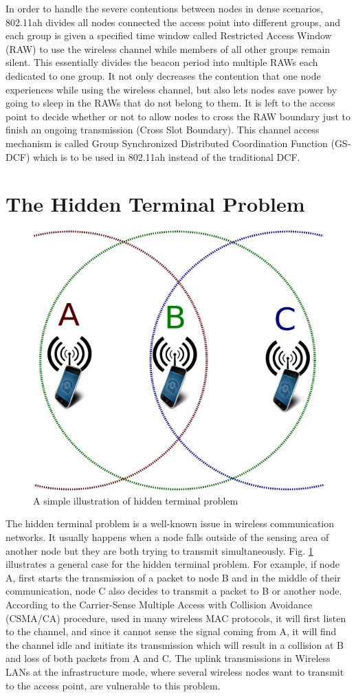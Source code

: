  In order to handle the severe contentions between nodes in dense scenarios, 802.11ah divides all nodes connected the access point into different groups, and each group is given a specified time window called Restricted Access Window (RAW) to use the wireless channel while members of all other groups remain silent. This essentially divides the beacon period into multiple RAWs each dedicated to one group. It not only decreases the contention that one node experiences while using the wireless channel, but also lets nodes save power by going to sleep in the RAWs that do not belong to them. It is left to the access point to decide whether or not to allow nodes to cross the RAW boundary just to finish an ongoing transmission (Cross Slot Boundary). This channel access mechanism is called Group Synchronized Distributed Coordination Function (GS-DCF) which is to be used in 802.11ah instead of the traditional DCF.   

\section{The Hidden Terminal Problem}
\begin{figure} [th]
  \centering
  \includegraphics[width=.65\textwidth]{figures/hidden}
  \caption{A simple illustration of hidden terminal problem}
  \label{fig:hidden}
\end{figure}

The hidden terminal problem is a well-known issue in wireless communication networks. It usually happens when a node falls outside of the sensing area of another node but they are both trying to transmit simultaneously. Fig. \ref{fig:hidden} illustrates a general case for the hidden terminal problem. For example, if node A, first starts the transmission of a packet to node B and in the middle of their communication, node C also decides to transmit a packet to B or another node. According to the Carrier-Sense Multiple Access with Collision Avoidance (CSMA/CA) procedure, used in many wireless MAC protocols, it will first listen to the channel, and since it cannot sense the signal coming from A, it will find the channel idle and initiate its transmission which will result in a collision at B and loss of both packets from A and C. The uplink transmissions in Wireless LANs at the infrastructure mode, where several wireless nodes want to transmit to the access point, are vulnerable to this problem. 



